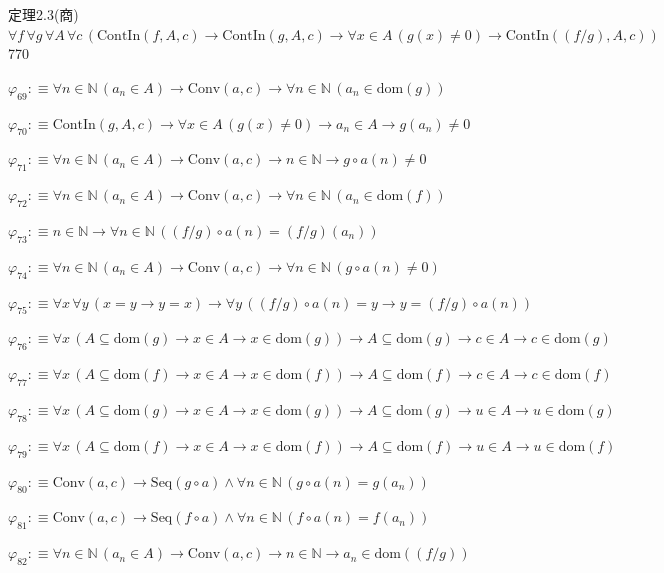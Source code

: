 \begin{fullproof}{定理2.3(商)}{$\forall f\,\forall g\,\forall A\,\forall c\,(\mathrm{ContIn}(f,A,c) \to \mathrm{ContIn}(g,A,c) \to \forall x \in A\,(g(x) \neq 0) \to \mathrm{ContIn}((f / g),A,c))$}{770}
\begin{abbrevlist}
\item $\varphi_{69} :\equiv \forall n \in \mathbb{N}\,(a_{n} \in A) \to \mathrm{Conv}(a,c) \to \forall n \in \mathbb{N}\,(a_{n} \in \mathrm{dom}(g))$
\item $\varphi_{70} :\equiv \mathrm{ContIn}(g,A,c) \to \forall x \in A\,(g(x) \neq 0) \to a_{n} \in A \to g(a_{n}) \neq 0$
\item $\varphi_{71} :\equiv \forall n \in \mathbb{N}\,(a_{n} \in A) \to \mathrm{Conv}(a,c) \to n \in \mathbb{N} \to g \circ a(n) \neq 0$
\item $\varphi_{72} :\equiv \forall n \in \mathbb{N}\,(a_{n} \in A) \to \mathrm{Conv}(a,c) \to \forall n \in \mathbb{N}\,(a_{n} \in \mathrm{dom}(f))$
\item $\varphi_{73} :\equiv n \in \mathbb{N} \to \forall n \in \mathbb{N}\,((f / g) \circ a(n) = (f / g)(a_{n}))$
\item $\varphi_{74} :\equiv \forall n \in \mathbb{N}\,(a_{n} \in A) \to \mathrm{Conv}(a,c) \to \forall n \in \mathbb{N}\,(g \circ a(n) \neq 0)$
\item $\varphi_{75} :\equiv \forall x\,\forall y\,(x = y \to y = x) \to \forall y\,((f / g) \circ a(n) = y \to y = (f / g) \circ a(n))$
\item $\varphi_{76} :\equiv \forall x\,(A \subseteq \mathrm{dom}(g) \to x \in A \to x \in \mathrm{dom}(g)) \to A \subseteq \mathrm{dom}(g) \to c \in A \to c \in \mathrm{dom}(g)$
\item $\varphi_{77} :\equiv \forall x\,(A \subseteq \mathrm{dom}(f) \to x \in A \to x \in \mathrm{dom}(f)) \to A \subseteq \mathrm{dom}(f) \to c \in A \to c \in \mathrm{dom}(f)$
\item $\varphi_{78} :\equiv \forall x\,(A \subseteq \mathrm{dom}(g) \to x \in A \to x \in \mathrm{dom}(g)) \to A \subseteq \mathrm{dom}(g) \to u \in A \to u \in \mathrm{dom}(g)$
\item $\varphi_{79} :\equiv \forall x\,(A \subseteq \mathrm{dom}(f) \to x \in A \to x \in \mathrm{dom}(f)) \to A \subseteq \mathrm{dom}(f) \to u \in A \to u \in \mathrm{dom}(f)$
\item $\varphi_{80} :\equiv \mathrm{Conv}(a,c) \to \mathrm{Seq}(g \circ a) \land \forall n \in \mathbb{N}\,(g \circ a(n) = g(a_{n}))$
\item $\varphi_{81} :\equiv \mathrm{Conv}(a,c) \to \mathrm{Seq}(f \circ a) \land \forall n \in \mathbb{N}\,(f \circ a(n) = f(a_{n}))$
\item $\varphi_{82} :\equiv \forall n \in \mathbb{N}\,(a_{n} \in A) \to \mathrm{Conv}(a,c) \to n \in \mathbb{N} \to a_{n} \in \mathrm{dom}((f / g))$

\end{abbrevlist}
\end{fullproof}
